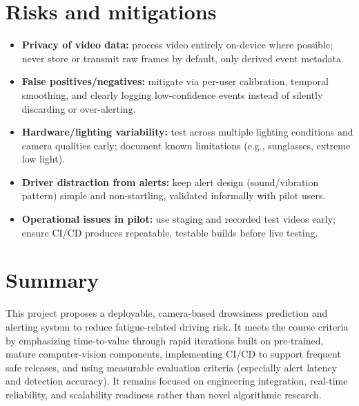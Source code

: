 \documentclass[11pt,a4paper]{article}
\begin{document}
\section{Risks and mitigations}
\begin{itemize}[leftmargin=0.7cm]
    \item \textbf{Privacy of video data:} process video entirely on-device where possible; never store or transmit raw frames by default, only derived event metadata.
    \item \textbf{False positives/negatives:} mitigate via per-user calibration, temporal smoothing, and clearly logging low-confidence events instead of silently discarding or over-alerting.
    \item \textbf{Hardware/lighting variability:} test across multiple lighting conditions and camera qualities early; document known limitations (e.g., sunglasses, extreme low light).
    \item \textbf{Driver distraction from alerts:} keep alert design (sound/vibration pattern) simple and non-startling, validated informally with pilot users.
    \item \textbf{Operational issues in pilot:} use staging and recorded test videos early; ensure CI/CD produces repeatable, testable builds before live testing.
\end{itemize}

\section{Summary}
This project proposes a deployable, camera-based
drowsiness prediction and alerting system to reduce
fatigue-related driving risk. It meets the course
criteria by emphasizing time-to-value through rapid
iterations built on pre-trained, mature computer-vision
components, implementing CI/CD to support frequent safe
releases, and using measurable evaluation criteria
(especially alert latency and detection accuracy). It
remains focused on engineering integration, real-time
reliability, and scalability readiness rather than
novel algorithmic research.
\end{document}
